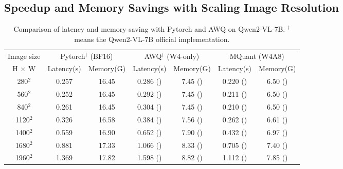 \subsection{Speedup and Memory Savings with Scaling Image Resolution}
\begin{table}[h]
    \caption{Comparison of latency and memory saving with Pytorch and AWQ on Qwen2-VL-7B. $^{\ddag}$ means the Qwen2-VL-7B official implementation.}
    \vspace{-4.5mm}
    \label{tab:ablation2}
    \begin{adjustbox}{max width=\linewidth}
        \begin{tabular}{ccc|cc|cc}\\
        \toprule 
        Image size & \multicolumn{2}{c|}{Pytorch$^{\ddag}$ (BF16)}& \multicolumn{2}{c|}{AWQ$^{\ddag}$ (W4-only)}& \multicolumn{2}{c}{MQuant (W4A8)} \\ \cline{2-7}
         H $\times$ W & Latency(s)& Memory(G) & Latency(s)& Memory(G)&Latency(s)& Memory(G) \\
        \midrule        
        280$^2$ & 0.257 &16.45 &0.286 (\color{myred}{-10.14\%}) &7.45 (\color{mygreen1}{+120.67\%}) &0.220 (\textbf{\color{mygreen1}{+16.82\%}}) &6.50 (\textbf{\color{mygreen1}{+152.92\%}})\\
        560$^2$ &0.252 &16.45 &0.292 (\color{myred}{-13.70\%}) &7.45 (\color{mygreen1}{+120.67\%})&0.211 (\textbf{\color{mygreen1}{+19.48\%}}) &6.50 (\textbf{\color{mygreen1}{+152.92\%}})\\
        840$^2$ & 0.261 &16.45 &0.304 (\color{myred}{-14.14\%}) &7.45 (\color{mygreen1}{+120.67\%})&0.210 (\textbf{\color{mygreen1}{+24.76\%}})&6.50 (\textbf{\color{mygreen1}{+152.92\%}})\\
        1120$^2$ & 0.326 &16.58 &0.384 (\color{myred}{-15.10\%}) &7.56 (\color{mygreen1}{+119.51\%})&0.262 (\textbf{\color{mygreen1}{+24.48\%}})&6.61 (\textbf{\color{mygreen1}{+151.59\%}})\\
        1400$^2$ & 0.559 &16.90 &0.652 (\color{myred}{-14.29\%}) &7.90 (\color{mygreen1}{+113.92\%})&0.432 (\textbf{\color{mygreen1}{+20.24\%}})&6.97 (\textbf{\color{mygreen1}{+142.71\%}})\\
        1680$^2$ & 0.881 &17.33 &1.066 (\color{myred}{-17.39\%}) &8.33 (\color{mygreen1}{+108.57\%})&0.705 (\textbf{\color{mygreen1}{+18.23\%}})&7.40 (\textbf{\color{mygreen1}{+130.27\%}})\\
        1960$^2$ & 1.369 &17.82 &1.598 (\color{myred}{-14.26\%}) &8.82 (\color{mygreen1}{+100.00\%})&1.112 (\textbf{\color{mygreen1}{+16.63\%}})&7.85 (\textbf{\color{mygreen1}{+119.93\%}})\\

\end{tabular}
\end{adjustbox}
\end{table}
